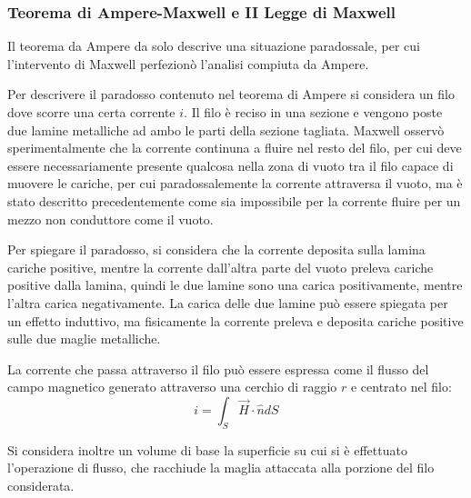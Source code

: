 \documentclass{article}
\numberwithin{equation}{subsection}
\begin{document}
\subsubsection{Teorema di Ampere-Maxwell e II Legge di Maxwell}
Il teorema da Ampere da solo descrive una situazione paradossale, per cui l'intervento di Maxwell perfezionò l'analisi compiuta da Ampere. 

Per descrivere il paradosso contenuto nel teorema di Ampere si considera un filo dove scorre una certa corrente $i$. Il filo è reciso in una sezione e vengono poste due 
lamine metalliche ad ambo le parti della sezione tagliata. Maxwell osservò sperimentalmente che la corrente continuna a fluire nel resto del filo, per cui deve essere 
necessariamente presente qualcosa nella zona di vuoto tra il filo capace di muovere le cariche, per cui paradossalemente la corrente attraversa il vuoto, ma è stato descritto 
precedentemente come sia impossibile per la corrente fluire per un mezzo non conduttore come il vuoto. 

Per spiegare il paradosso, si considera che la corrente deposita sulla lamina cariche positive, mentre la corrente dall'altra parte del vuoto preleva cariche positive dalla lamina, 
quindi le due lamine sono una carica positivamente, mentre l'altra carica negativamente. La carica delle due lamine può essere spiegata per un effetto induttivo, ma fisicamente 
la corrente preleva e deposita cariche positive sulle due maglie metalliche. 


La corrente che passa attraverso il filo può essere espressa come il flusso del campo magnetico generato attraverso una cerchio di raggio $r$ e centrato nel filo:
\begin{equation*}
    i=\int_S{\vec{H}}\cdot\hat{n}dS
\end{equation*} 

Si considera inoltre un volume di base la superficie su cui si è effettuato l'operazione di flusso, che racchiude la maglia attaccata alla porzione del filo considerata. 
\end{document}
